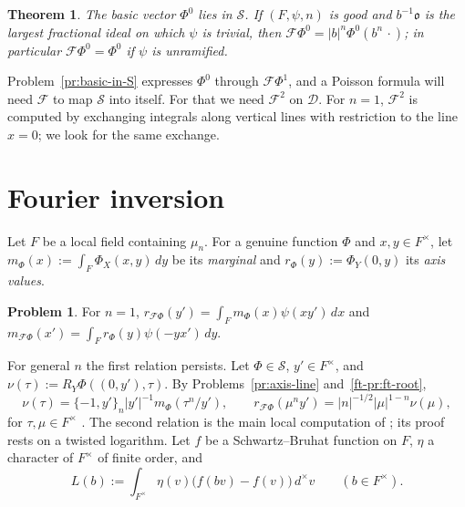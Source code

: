 \documentclass[reqno]{amsart}
\newcommand{\Fc}{\mathcal{F}}
\newcommand{\Dc}{\mathcal{D}}
\newcommand{\Sc}{\mathcal{S}}
\newcommand{\oo}{\mathfrak{o}}
\numberwithin{equation}{section}
\theoremstyle{definition}
\newtheorem{problem}{Problem}[section]
\theoremstyle{plain}
\newtheorem{theorem}{Theorem}[section]
\begin{document}
\begin{theorem}\label{th:basic}
  The basic vector $\Phi^0$ lies in $\Sc$.  If $(F, \psi, n)$ is good and $b^{-1} \oo$ is the largest fractional ideal on which $\psi$ is trivial, then $\Fc \Phi^0 = \lvert b \rvert^n \Phi^0(b^n \, \cdot)$; in particular $\Fc \Phi^0 = \Phi^0$ if $\psi$ is unramified.
\end{theorem}

Problem~\ref{pr:basic-in-S} expresses $\Phi^0$ through $\Fc \Phi^1$, and a Poisson formula will need $\Fc$ to map $\Sc$ into itself.  For that we need $\Fc^2$ on $\Dc$.  For $n = 1$, $\Fc^2$ is computed by exchanging integrals along vertical lines with restriction to the line $x = 0$; we look for the same exchange.

\section{Fourier inversion}\label{sec:inversion}

Let $F$ be a local field containing $\mu_n$.  For a genuine function $\Phi$ and $x, y \in F^\times$, let $m_\Phi(x) := \int_F \Phi_X(x, y) \, d y$ be its \emph{marginal} and $r_\Phi(y) := \Phi_Y(0, y)$ its \emph{axis values}.

\begin{problem}\label{pr:lin-marginals}
  For $n = 1$, $r_{\Fc \Phi}(y') = \int_F m_\Phi(x) \psi(x y') \, d x$ and $m_{\Fc \Phi}(x') = \int_F r_\Phi(y) \psi(- y x') \, d y$.
\end{problem}

For general $n$ the first relation persists.  Let $\Phi \in \Sc$, $y' \in F^\times$, and $\nu(\tau) := R_Y \Phi((0, y'), \tau)$.  By Problems~\ref{pr:axis-line} and~\ref{ft-pr:ft-root},
\begin{equation}\label{eq:marg-to-axis}
  \nu(\tau) = \{-1, y'\}_n \lvert y' \rvert^{-1} m_\Phi(\tau^n / y'),
  \qquad
  r_{\Fc \Phi}(\mu^n y') = \lvert n \rvert^{-1/2} \lvert \mu \rvert^{1-n} \hat{\nu}(\mu),
\end{equation}
for $\tau, \mu \in F^\times$ \cite[Lemma~A.1]{N}.  The second relation is the main local computation of \cite{N}; its proof rests on a twisted logarithm.  Let $f$ be a Schwartz--Bruhat function on $F$, $\eta$ a character of $F^\times$ of finite order, and
\begin{equation*}
  L(b) := \int_{F^\times} \eta(v) \bigl( f(b v) - f(v) \bigr) \, d^\times v
  \qquad (b \in F^\times).
\end{equation*}
\end{document}
